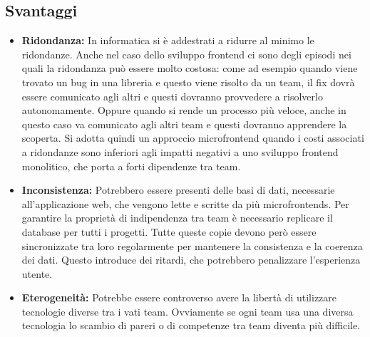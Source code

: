 \subsection{Svantaggi}
\begin{itemize}

\item \textbf{Ridondanza:}
In informatica si è addestrati a ridurre al minimo le ridondanze.
Anche nel caso dello sviluppo frontend ci sono degli episodi nei quali la ridondanza può
 essere molto costosa: come ad esempio quando viene trovato un bug in una libreria e 
 questo viene risolto da un team, il fix dovrà essere comunicato agli altri e questi 
 dovranno provvedere a risolverlo autonomamente. Oppure quando si rende un processo più 
 veloce, anche in questo caso va comunicato agli altri team e questi dovranno apprendere
  la scoperta.
Si adotta quindi un approccio microfrontend quando i costi associati a ridondanze sono 
inferiori agli impatti negativi a uno sviluppo frontend monolitico, che porta a forti 
dipendenze tra team.




\item \textbf{Inconsistenza:}
 Potrebbero essere presenti delle basi di dati, necessarie all'applicazione web, che vengono lette e scritte
 da più microfrontends.
Per garantire la proprietà di indipendenza tra team è necessario replicare il database per tutti i progetti. 
Tutte queste copie devono però essere sincronizzate tra loro regolarmente per mantenere la consistenza e la coerenza dei dati.
Questo introduce dei ritardi, che potrebbero penalizzare l'esperienza utente.

\item \textbf{Eterogeneità:}
Potrebbe essere controverso avere la libertà di utilizzare tecnologie diverse tra i vati team.
 Ovviamente se ogni team usa una diversa tecnologia lo scambio di pareri o di competenze 
 tra team diventa più difficile.
\end{itemize}